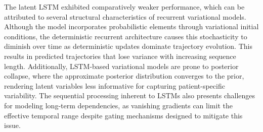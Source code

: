 \documentclass[preprint,12pt]{elsarticle}
\begin{document}
The latent LSTM exhibited comparatively weaker performance, which can be attributed to several structural characteristics of recurrent variational models. Although the model incorporates probabilistic elements through variational initial conditions, the deterministic recurrent architecture causes this stochasticity to diminish over time as deterministic updates dominate trajectory evolution. This results in predicted trajectories that lose variance with increasing sequence length. Additionally, LSTM-based variational models are prone to posterior collapse, where the approximate posterior distribution converges to the prior, rendering latent variables less informative for capturing patient-specific variability. The sequential processing inherent to LSTMs also presents challenges for modeling long-term dependencies, as vanishing gradients can limit the effective temporal range despite gating mechanisms designed to mitigate this issue.

\begin{table}[ht]
\centering
\caption{Performance comparison of latent SDE, latent ODE, latent CDE, and latent LSTM models on the synthetic PKPD dataset. Lower values are better for RMSE, PE, CRPS, and NLL; higher values are better for accuracy.}
\label{tab:model_performance_pkpd}
\begin{small}
\end{small}
\end{table}
\end{document}
